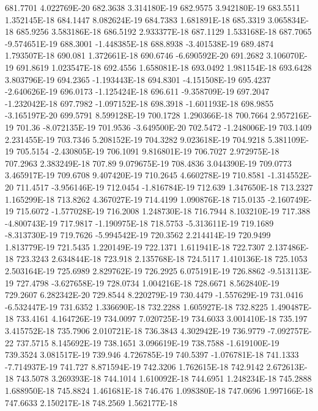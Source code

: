 681.7701  4.022769E-20
682.3638  3.314180E-19
682.9575  3.942180E-19
683.5511  1.352145E-18
684.1447  8.082624E-19
684.7383  1.681891E-18
685.3319  3.065834E-18
685.9256  3.583186E-18
686.5192  2.933377E-18
687.1129  1.533168E-18
687.7065  -9.574651E-19
688.3001  -1.448385E-18
688.8938  -3.401538E-19
689.4874  1.793507E-18
690.081  1.372661E-18
690.6746  -6.690592E-20
691.2682  3.106070E-19
691.8619  1.023547E-18
692.4556  1.658081E-18
693.0492  1.981154E-18
693.6428  3.803796E-19
694.2365  -1.193443E-18
694.8301  -4.151508E-19
695.4237  -2.640626E-19
696.0173  -1.125424E-18
696.611  -9.358709E-19
697.2047  -1.232042E-18
697.7982  -1.097152E-18
698.3918  -1.601193E-18
698.9855  -3.165197E-20
699.5791  8.599128E-19
700.1728  1.290366E-18
700.7664  2.957216E-19
701.36  -8.072135E-19
701.9536  -3.649500E-20
702.5472  -1.248006E-19
703.1409  2.231455E-19
703.7346  5.208152E-19
704.3282  9.023618E-19
704.9218  5.381109E-19
705.5154  -2.430805E-19
706.1091  9.816801E-19
706.7027  2.972975E-18
707.2963  2.383249E-18
707.89  9.079675E-19
708.4836  3.044390E-19
709.0773  3.465917E-19
709.6708  9.407420E-19
710.2645  4.660278E-19
710.8581  -1.314552E-20
711.4517  -3.956146E-19
712.0454  -1.816784E-19
712.639  1.347650E-18
713.2327  1.165299E-18
713.8262  4.367027E-19
714.4199  1.090876E-18
715.0135  -2.160749E-19
715.6072  -1.577028E-19
716.2008  1.248730E-18
716.7944  8.103210E-19
717.388  -4.800743E-19
717.9817  -1.190975E-18
718.5753  -5.313611E-19
719.1689  -8.313730E-19
719.7626  -5.994542E-19
720.3562  2.214414E-19
720.9499  1.813779E-19
721.5435  1.220149E-19
722.1371  1.611941E-18
722.7307  2.137486E-18
723.3243  2.634844E-18
723.918  2.135768E-18
724.5117  1.410136E-18
725.1053  2.503164E-19
725.6989  2.829762E-19
726.2925  6.075191E-19
726.8862  -9.513113E-19
727.4798  -3.627658E-19
728.0734  1.004216E-18
728.6671  8.562840E-19
729.2607  6.282342E-20
729.8544  8.220279E-19
730.4479  -1.557629E-19
731.0416  -6.532447E-19
731.6352  1.336690E-18
732.2288  1.605927E-18
732.8225  1.490487E-18
733.4161  4.164726E-19
734.0097  7.020725E-19
734.6033  3.001410E-18
735.197  3.415752E-18
735.7906  2.010721E-18
736.3843  4.302942E-19
736.9779  -7.092757E-22
737.5715  8.145692E-19
738.1651  3.096619E-19
738.7588  -1.619100E-19
739.3524  3.081517E-19
739.946  4.726785E-19
740.5397  -1.076781E-18
741.1333  -7.714937E-19
741.727  8.871594E-19
742.3206  1.762615E-18
742.9142  2.672613E-18
743.5078  3.269393E-18
744.1014  1.610092E-18
744.6951  1.248234E-18
745.2888  1.688950E-18
745.8824  1.461681E-18
746.476  1.098380E-18
747.0696  1.997166E-18
747.6633  2.150217E-18
748.2569  1.562177E-18
